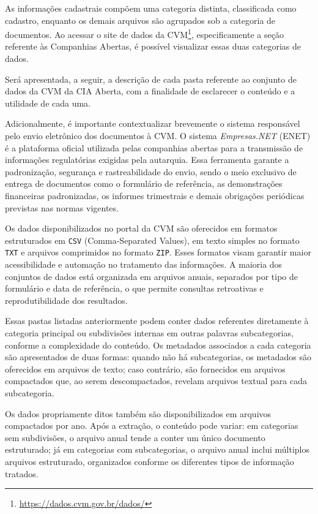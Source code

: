 As informações cadastrais compõem uma categoria distinta, classificada como cadastro, enquanto os demais arquivos são agrupados sob a categoria de documentos. Ao acessar o site de dados da CVM\footnote{\url{https://dados.cvm.gov.br/dados/}}, especificamente a seção referente às Companhias Abertas, é possível visualizar essas duas categorias de dados.

Será apresentada, a seguir, a descrição de cada pasta referente ao conjunto de dados da CVM da CIA Aberta, com a finalidade de esclarecer o conteúdo e a utilidade de cada uma.

Adicionalmente, é importante contextualizar brevemente o sistema responsável pelo envio eletrônico dos documentos à CVM. O sistema \textit{Empresas.NET} (ENET) é a plataforma oficial utilizada pelas companhias abertas para a transmissão de informações regulatórias exigidas pela autarquia. Essa ferramenta garante a padronização, segurança e rastreabilidade do envio, sendo o meio exclusivo de entrega de documentos como o formulário de referência, as demonstrações financeiras padronizadas, os informes trimestrais e demais obrigações periódicas previstas nas normas vigentes.

Os dados disponibilizados no portal da CVM são oferecidos em formatos estruturados em \texttt{CSV} (Comma-Separated Values), em texto simples no formato \texttt{TXT} e arquivos comprimidos no formato \texttt{ZIP}. Esses formatos visam garantir maior acessibilidade e automação no tratamento das informações. A maioria dos conjuntos de dados está organizada em arquivos anuais, separados por tipo de formulário e data de referência, o que permite consultas retroativas e reprodutibilidade dos resultados.

Essas pastas listadas anteriormente podem conter dados referentes diretamente à categoria principal ou subdivisões internas em outras palavras subcategorias, conforme a complexidade do conteúdo. Os metadados associados a cada categoria são apresentados de duas formas: quando não há subcategorias, os metadados são oferecidos em arquivos de texto; caso contrário, são fornecidos em arquivos compactados que, ao serem descompactados, revelam arquivos textual para cada subcategoria.

Os dados propriamente ditos também são disponibilizados em arquivos compactados por ano. Após a extração, o conteúdo pode variar: em categorias sem subdivisões, o arquivo anual tende a conter um único documento estruturado; já em categorias com subcategorias, o arquivo anual inclui múltiplos arquivos estruturado, organizados conforme os diferentes tipos de informação tratados.

